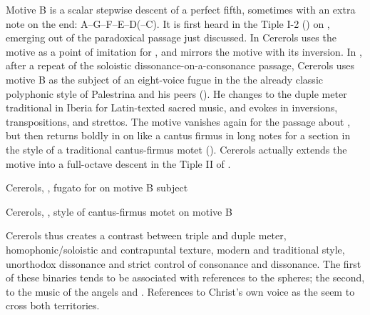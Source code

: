 
Motive B is a scalar stepwise descent of a perfect fifth, sometimes with an
extra note on the end: A--G--F--E--D(--C\sh). 
It is first heard in the Tiple I-2 () on ,
emerging out of the paradoxical passage just discussed.
In  Cererols uses the motive as a point of imitation for
, and mirrors the motive with its
inversion.
In , after a repeat of the soloistic dissonance-on-a-consonance
passage, Cererols uses motive B as the subject of an eight-voice fugue in the
the already classic polyphonic style of Palestrina and his peers
().
He changes to the duple meter traditional in Iberia for Latin-texted sacred
music, and evokes  in inversions, transpositions,
and strettos.  
The motive vanishes again for the passage about , but then 
returns boldly in  on  like a
 cantus firmus in long notes for a section in the style of
a traditional cantus-firmus motet
().
Cererols actually extends the motive into a full-octave descent in the Tiple II
of .


\begin{musicexample}
    \caption{Cererols, , fugato  for
     on motive B subject}
    \label{mus:Cererols-Suspended-contrapunto_celestial}
\end{musicexample}

\begin{musicexample}
    \caption{Cererols, , style of cantus-firmus
    motet on motive B} 
    \label{mus:Cererols-Suspended-canto_llano}
\end{musicexample}

Cererols thus creates a contrast between triple and duple meter,
homophonic/soloistic and contrapuntal texture, modern and traditional style,
unorthodox dissonance and strict control of consonance and dissonance.
The first of these binaries tends to be associated with references to the
spheres; the second, to the music of the angels and . 
References to Christ's own voice as the  seem to cross both
territories.

